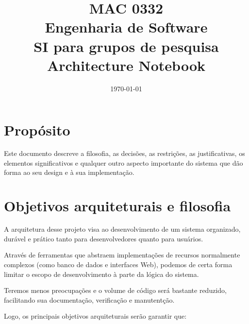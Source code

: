 \documentclass[11pt, a4paper]{article}
\title{MAC 0332\\
	Engenharia de Software\\
	SI para grupos de pesquisa\\
	Architecture Notebook}
\date{\today}
\begin{document}
	\maketitle
	\newpage
	
	\section{Propósito}
        Este documento descreve a filosofia, as decisões, as restrições, as
        justificativas, os elementos significativos e qualquer outro aspecto
        importante do sistema que dão forma ao seu design e à sua implementação.

    \section{Objetivos arquiteturais e filosofia}
        A arquitetura desse projeto visa ao desenvolvimento de um sistema
        organizado, durável e prático tanto para desenvolvedores quanto para
        usuários.

        Através de ferramentas que abstraem implementações de recursos
        normalmente complexos (como banco de dados e interfaces Web), podemos
        de certa forma limitar o escopo de desenvolvimento à parte da lógica do
        sistema.

        Teremos menos preocupações e o volume de código será bastante reduzido,
        facilitando sua documentação, verificação e manutentção.

        Logo, os principais objetivos arquiteturais serão garantir que:
\end{document}
